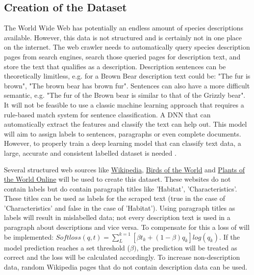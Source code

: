 \documentclass[a4paper, 12pt, oneside]{book} %
\begin{document}
\subsection{Creation of the Dataset}
The World Wide Web has potentially an endless amount of species descriptions available.
However, this data is not structured and is certainly not in one place on the internet.
The web crawler needs to automatically query species description pages from search engines, search those queried pages for description text, and store the text that qualifies as a description.
Description sentences can be theoretically limitless, e.g. for a Brown Bear description text could be: "The fur is brown", "The brown bear has brown fur".
Sentences can also have a more difficult semantic, e.g. "The fur of the Brown bear is similar to that of the Grizzly bear".
It will not be feasible to use a classic machine learning approach that requires a rule-based match system for sentence classification. 
A DNN that can automatically extract the features and classify the text can help out.
This model will aim to assign labels to sentences, paragraphs or even complete documents. 
However, to properly train a deep learning model that can classify text data, a large, accurate and consistent labelled dataset is needed \autocite{munappy_data_2019}.

Several structured web sources like \href{http://www.Wikipedia.com}{Wikipedia}, \href{https://birdsoftheworld.org}{Birds of the World} and \href{http://powo.science.kew.org/}{Plants of the World Online} will be used to create this dataset.
These websites do not contain labels but do contain paragraph titles like 'Habitat', 'Characteristics'. 
These titles can be used as labels for the scraped text (true in the case of 'Characteristics' and false in the case of 'Habitat').
Using paragraph titles as labels will result in mislabelled data; not every description text is used in a paragraph about descriptions and vice versa.
To compensate for this a loss of \textcite{reed_training_2015} will be implemented: \( Softloss(q, t) =  \sum_{L}^{k=1} [\beta t _k + (1- \beta )q _k]log(q _k) \).
If the model prediction reaches a set threshold (\(\beta)\), the prediction will be treated as correct and the loss will be calculated accordingly.
To increase non-description data, random Wikipedia pages that do not contain description data can be used.
\end{document}
